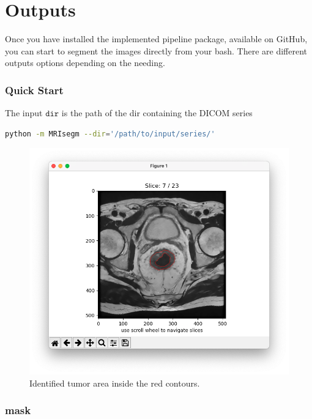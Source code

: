 \documentclass{standalone}
\begin{document}
\section{Outputs}
Once you have installed the implemented pipeline package, available on GitHub\cite{img-segm}, you can start to segment the images directly from your bash.
There are different outputs options depending on the needing.

\subsubsection{Quick Start}

The input $\mathtt{dir}$ is the path of the dir containing the DICOM series

\begin{lstlisting}[language = bash]
python -m MRIsegm --dir='/path/to/input/series/'  
\end{lstlisting}

\begin{figure}[ht]

    \centering
    \includegraphics[width=\textwidth]{../images/example_quickstart.png}

    \caption{Identified tumor area inside the red contours.}
    \label{quickstart}
    
\end{figure}

\subsubsection{mask}
\end{document}
